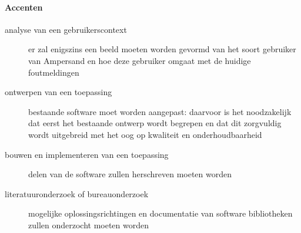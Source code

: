 \paragraph{Accenten}
\begin{description}
\item[analyse van een gebruikerscontext] er zal enigszins een beeld moeten worden gevormd van het soort gebruiker van Ampersand en hoe deze gebruiker omgaat met de huidige foutmeldingen
\item[ontwerpen van een toepassing] bestaande software moet worden aangepast: daarvoor is het noodzakelijk dat eerst het bestaande ontwerp wordt begrepen en dat dit zorgvuldig wordt uitgebreid met het oog op kwaliteit en onderhoudbaarheid
\item[bouwen en implementeren van een toepassing] delen van de software zullen herschreven moeten worden
\item[literatuuronderzoek of bureauonderzoek] mogelijke oplossingsrichtingen en documentatie van software bibliotheken zullen onderzocht moeten worden
\end{description}

